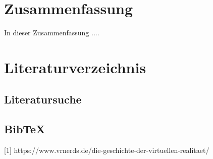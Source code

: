 \documentclass[deutsch]{llncs}
\begin{document}
\section{Zusammenfassung}
\label{sec:typo}
In dieser Zusammenfassung .... 

\section{Literaturverzeichnis}
\label{sec:bib}

\subsection{Literatursuche}
\label{subsec:search}


\subsection{BibTeX}
\label{subsec:bibtex}
[1] https://www.vrnerds.de/die-geschichte-der-virtuellen-realitaet/
\cite{2 http://virtualrealityforeducation.com/wp-content/uploads/2018/06/HuAu_Lee_2017_VRinEd.pdf}

\printbibliography
\end{document}
